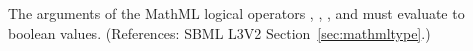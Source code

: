 The arguments of the MathML logical operators , ,
, and  must evaluate to boolean values.  (References:
SBML L3V2 Section~\ref{sec:mathmltype}.)
